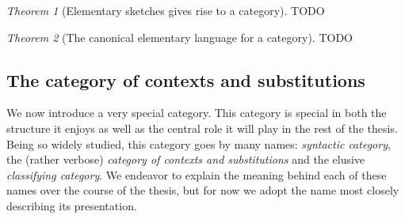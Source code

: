 \documentclass[12pt,twoside]{reedthesis}
\theoremstyle{definition}
\theoremstyle{remark}
\theoremstyle{theorem}
\newtheorem{theorem}{Theorem}
\begin{document}
\begin{theorem}[Elementary sketches gives rise to a category]\label{thm:sketch cat}
  TODO
\end{theorem}

\begin{theorem}[The canonical elementary language for a category]\label{thm:canon lang}
  TODO
\end{theorem}



\subsection{The category of contexts and substitutions}
We now introduce a very special category. This category is special in both the
structure it enjoys as well as the central role it will play in the rest of the
thesis. Being so widely studied, this category goes by many names:
\emph{syntactic category}, the (rather verbose) \emph{category of contexts and
substitutions} and the elusive \emph{classifying category}. We endeavor to
explain the meaning behind each of these names over the course of the thesis,
but for now we adopt the name most closely describing its presentation.

\newcommand{\id}{\text{id}} %
\end{document}

